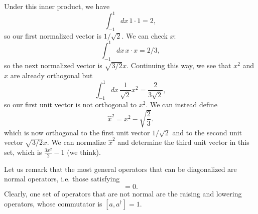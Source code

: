 Under this inner product, we have
\begin{equation}
    \int_{-1}^1 dx\, 1\cdot 1 = 2,
\end{equation}
so our first normalized vector is $1/\sqrt{2}$. We can check $x$:
\begin{equation}
    \int_{-1}^1 dx\, x\cdot x  =2/3,
\end{equation}
so the next normalized vector is $\sqrt{3/2}x.$ Continuing this way, we see that $x^2$ and $x$ are already orthogonal but
\begin{equation}
    \int_{-1}^1 dx\, \frac{1}{\sqrt{2}} x^2 = \frac{2}{3\sqrt{2}},
\end{equation}
so our first unit vector is not orthogonal to $x^2$. We can instead define
\begin{equation}
    \hat x^2 = x^2 -\sqrt{\frac{2}{3}}.%
\end{equation}
which is now orthogonal to the first unit vector $1/\sqrt{2}$ and to the second unit vector $\sqrt{3/2}x$. We can normalize $\hat x^2$ and determine the third unit vector in this set, which is $\frac{3x^2}{2}-1$ (we think).

Let us remark that the most general operators that can be diagonalized are normal operators, i.e. those satisfying
\begin{equation}
    [A,A^\dagger]=0.
\end{equation}
Clearly, one set of operators that are not normal are the raising and lowering operators, whose commutator is $[a,a^\dagger]=1$.